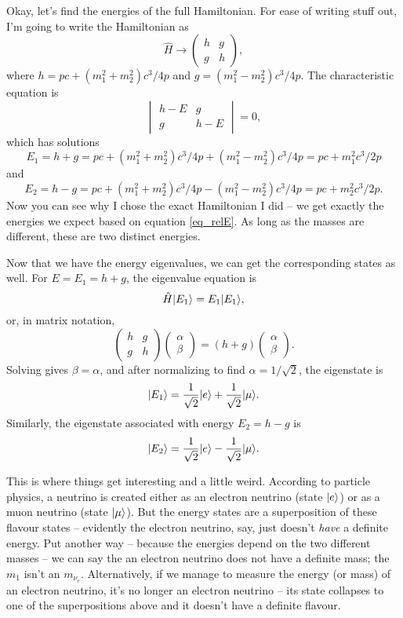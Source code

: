 Okay, let's find the energies of the full Hamiltonian.  For ease of writing stuff out, I'm going to write the Hamiltonian as
\[
\hat{H} \to \begin{pmatrix}
h & g \\
g & h 
\end{pmatrix},
\]
where $h = pc + (m_1^2 + m_2^2) c^3/4p$ and $g = (m_1^2 - m_2^2)c^3/4p$.  The characteristic equation is
\[
\begin{vmatrix}
h - E & g \\
g & h - E
\end{vmatrix} = 0,
\]
which has solutions
\begin{equation}
E_1 = h + g = pc + (m_1^2 + m_2^2) c^3/4p + (m_1^2 - m_2^2)c^3/4p = pc + m_1^2 c^3 / 2p
\end{equation}
and
\begin{equation}
E_2 = h - g = pc + (m_1^2 + m_2^2) c^3/4p - (m_1^2 - m_2^2)c^3/4p = pc + m_2^2 c^3 / 2p.
\end{equation}
Now you can see why I chose the exact Hamiltonian I did -- we get exactly the energies we expect based on equation \ref{eq_relE}.  As long as the masses are different, these are two distinct energies.

Now that we have the energy eigenvalues, we can get the corresponding states as well.  For $E = E_1 = h + g$, the eigenvalue equation is
\[
\hat{H} | E_1 \rangle = E_1 | E_1 \rangle,
\]
or, in matrix notation,
\[
\begin{pmatrix}
h & g \\
g & h
\end{pmatrix} \begin{pmatrix}  \alpha \\ \beta \end{pmatrix} = (h+g) \begin{pmatrix}  \alpha \\ \beta \end{pmatrix}.
\]
Solving gives $\beta = \alpha$, and after normalizing to find $\alpha = 1/\sqrt{2}$, the eigenstate is 
\begin{equation}
\label{eq_E1}
| E_1 \rangle = \frac{1}{\sqrt{2}} | e \rangle + \frac{1}{\sqrt{2}} | \mu \rangle.
\end{equation}
Similarly, the eigenstate associated with energy $E_2 = h - g$ is
\begin{equation}
\label{eq_E2}
| E_2 \rangle = \frac{1}{\sqrt{2}} | e \rangle - \frac{1}{\sqrt{2}} | \mu \rangle.
\end{equation}


This is where things get interesting and a little weird.   According to particle physics, a neutrino is created either as an electron neutrino (state $| e \rangle$) or as a muon neutrino (state $| \mu \rangle$).  But the energy states are a superposition of these flavour states -- evidently the electron neutrino, say, just doesn't \emph{have} a definite energy.  Put another way -- because the energies depend on the two different masses -- we can say the an electron neutrino does not have a definite mass; the $m_1$ isn't an $m_{\nu_e}$.  Alternatively, if we manage to measure the energy (or mass) of an electron neutrino, it's no longer an electron neutrino -- its state collapses to one of the superpositions above and it doesn't have a definite flavour.

